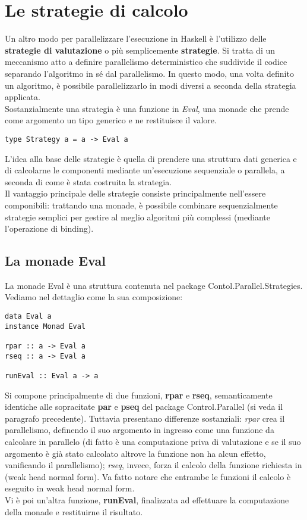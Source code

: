 \section{Le strategie di calcolo}
Un altro modo per parallelizzare l'esecuzione in Haskell è l'utilizzo delle \textbf{strategie di valutazione} o più semplicemente \textbf{strategie}. Si tratta di un meccanismo atto a definire parallelismo deterministico che suddivide il codice separando l'algoritmo in sé dal parallelismo. In questo modo, una volta definito un algoritmo, è possibile parallelizzarlo in modi diversi a seconda della strategia applicata.\\
Sostanzialmente una strategia è una funzione in \textit{Eval}, una monade che prende come argomento un tipo generico e ne restituisce il valore.
\begin{verbatim}
type Strategy a = a -> Eval a
\end{verbatim}
L'idea alla base delle strategie è quella di prendere una struttura dati generica e di calcolarne le componenti mediante un'esecuzione sequenziale o parallela, a seconda di come è stata costruita la strategia.\\
Il vantaggio principale delle strategie consiste principalmente nell'essere componibili: trattando una monade, è possibile combinare sequenzialmente strategie semplici per gestire al meglio algoritmi più complessi (mediante l'operazione di binding).
\subsection{La monade Eval}
La monade Eval è una struttura contenuta nel package Contol.Parallel.Strategies. Vediamo nel dettaglio come la sua composizione:
\begin{verbatim}
data Eval a
instance Monad Eval

rpar :: a -> Eval a
rseq :: a -> Eval a

runEval :: Eval a -> a
\end{verbatim}
Si compone principalmente di due funzioni, \textbf{rpar} e \textbf{rseq}, semanticamente identiche alle sopracitate \textbf{par} e \textbf{pseq} del package Control.Parallel (si veda il paragrafo precedente). Tuttavia presentano differenze sostanziali: \textit{rpar} crea il parallelismo, definendo il suo argomento in ingresso come una funzione da calcolare in parallelo (di fatto è una computazione priva di valutazione e se il suo argomento è già stato calcolato altrove la funzione non ha alcun effetto, vanificando il parallelismo); \textit{rseq}, invece, forza il calcolo della funzione richiesta in (weak head normal form). Va fatto notare che entrambe le funzioni il calcolo è eseguito in weak head normal form.\\
Vi è poi un'altra funzione, \textbf{runEval}, finalizzata ad effettuare la computazione della monade e restituirne il risultato.
